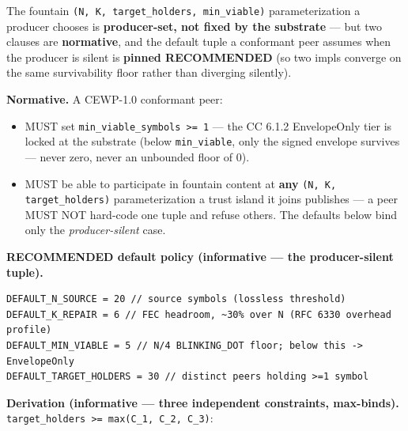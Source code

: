 \documentclass[11pt]{article}
\begin{document}
The fountain \texttt{(N, K, target\_holders, min\_viable)} parameterization a producer chooses is \textbf{producer-set, not fixed by the substrate} — but two clauses are \textbf{normative}, and the default tuple a conformant peer assumes when the producer is silent is \textbf{pinned RECOMMENDED} (so two impls converge on the same survivability floor rather than diverging silently).


\textbf{Normative.} A CEWP-1.0 conformant peer:

\begin{itemize}\setlength\itemsep{0pt}
\item MUST set \texttt{min\_viable\_symbols >= 1} — the CC 6.1.2 EnvelopeOnly tier is locked at the substrate (below \texttt{min\_viable}, only the signed envelope survives — never zero, never an unbounded floor of 0).
\item MUST be able to participate in fountain content at \textbf{any} \texttt{(N, K, target\_holders)} parameterization a trust island it joins publishes — a peer MUST NOT hard-code one tuple and refuse others. The defaults below bind only the \textit{producer-silent} case.
\end{itemize}


\textbf{RECOMMENDED default policy (informative — the producer-silent tuple).}


\begin{lstlisting}
DEFAULT_N_SOURCE = 20 // source symbols (lossless threshold)
DEFAULT_K_REPAIR = 6 // FEC headroom, ~30% over N (RFC 6330 overhead profile)
DEFAULT_MIN_VIABLE = 5 // N/4 BLINKING_DOT floor; below this -> EnvelopeOnly
DEFAULT_TARGET_HOLDERS = 30 // distinct peers holding >=1 symbol
\end{lstlisting}

\textbf{Derivation (informative — three independent constraints, max-binds).} \texttt{target\_holders >= max(C\_1, C\_2, C\_3)}:
\end{document}
